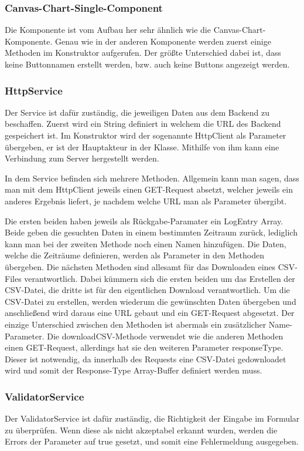 \subsubsection{Canvas-Chart-Single-Component}
Die Komponente ist vom Aufbau her sehr ähnlich wie die Canvas-Chart-Komponente. Genau wie in der anderen Komponente werden zuerst einige Methoden im Konstruktor aufgerufen. Der größte Unterschied dabei ist, dass keine Buttonnamen erstellt werden, bzw. auch keine Buttons angezeigt werden. 

\subsubsection{HttpService}
Der Service ist dafür zuständig, die jeweiligen Daten aus dem Backend zu beschaffen. Zuerst wird ein String definiert in welchem die URL des Backend gespeichert ist. Im Konstruktor wird der sogenannte HttpClient als Parameter übergeben, er ist der Hauptakteur in der Klasse. Mithilfe von ihm kann eine Verbindung zum Server hergestellt werden. 

In dem Service befinden sich mehrere Methoden. Allgemein kann man sagen, dass man mit dem HttpClient jeweils einen GET-Request absetzt, welcher jeweils ein anderes Ergebnis liefert, je nachdem welche URL man als Parameter übergibt.

Die ersten beiden haben jeweils als Rückgabe-Paramater ein LogEntry Array. Beide geben die gesuchten Daten in einem bestimmten Zeitraum zurück, lediglich kann man bei der zweiten Methode noch einen Namen hinzufügen. Die Daten, welche die Zeiträume definieren, werden als Parameter in den Methoden übergeben. Die nächsten Methoden sind allesamt für das Downloaden eines CSV-Files verantwortlich. Dabei kümmern sich die ersten beiden um das Erstellen der CSV-Datei, die dritte ist für den eigentlichen Download verantwortlich. Um die CSV-Datei zu erstellen, werden wiederum die gewünschten Daten übergeben und anschließend wird daraus eine URL gebaut und ein GET-Request abgesetzt. Der einzige Unterschied zwischen den Methoden ist abermals ein zusätzlicher Name-Parameter. Die downloadCSV-Methode verwendet wie die anderen Methoden einen GET-Request, allerdings hat sie den weiteren Parameter responseType. Dieser ist notwendig, da innerhalb des Requests eine CSV-Datei gedownloadet wird und somit der Response-Type Array-Buffer definiert werden muss. 

\subsubsection{ValidatorService}
Der ValidatorService ist dafür zuständig, die Richtigkeit der Eingabe im Formular zu überprüfen. Wenn diese als nicht akzeptabel erkannt wurden, werden die Errors der Parameter auf true gesetzt, und somit eine Fehlermeldung ausgegeben.

